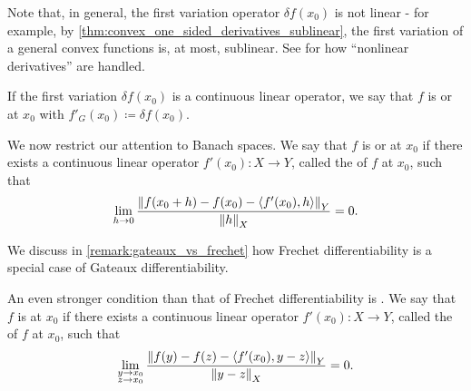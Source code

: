 \begin{definition}
\begin{defenum}
    Note that, in general, the first variation operator \( \delta f(x_0) \) is not linear - for example, by \cref{thm:convex_one_sided_derivatives_sublinear}, the first variation of a general convex functions is, at most, sublinear. See  for how \enquote{nonlinear derivatives} are handled.

    \cite[section 0.2.1]{Йоффе1974} If the first variation \( \delta f(x_0) \) is a continuous linear operator, we say that \( f \) is  or  at \( x_0 \) with  \( f'_G(x_0) \coloneqq \delta f(x_0) \).

    \cite[section 0.2.1]{Йоффе1974} We now restrict our attention to Banach spaces. We say that \( f \) is  or  at \( x_0 \) if there exists a continuous linear operator \( f'(x_0): X \to Y \), called the  of \( f \) at \( x_0 \), such that
    \begin{equation}\label{def:differentiability/frechet/condition}
      \lim_{h \to 0} \frac {\left\Vert f(x_0 + h) - f(x_0) - \left\langle f'(x_0), h \right\rangle \right\Vert_Y} {\left\Vert h \right\Vert_X} = 0.
    \end{equation}

    We discuss in \cref{remark:gateaux_vs_frechet} how Frechet differentiability is a special case of Gateaux differentiability.

    \cite[33]{Dontchev2014} An even stronger condition than that of Frechet differentiability is . We say that \( f \) is  at \( x_0 \) if there exists a continuous linear operator \( f'(x_0): X \to Y \), called the  of \( f \) at \( x_0 \), such that
    \begin{equation}\label{def:differentiability/strict/condition}
      \lim_{\substack{y \to x_0 \\ z \to x_0}} \frac {\left\Vert f(y) - f(z) - \left\langle f'(x_0), y - z \right\rangle \right\Vert_Y} {\left\Vert y - z \right\Vert_X} = 0.
    \end{equation}
  \end{defenum}
\end{definition}

